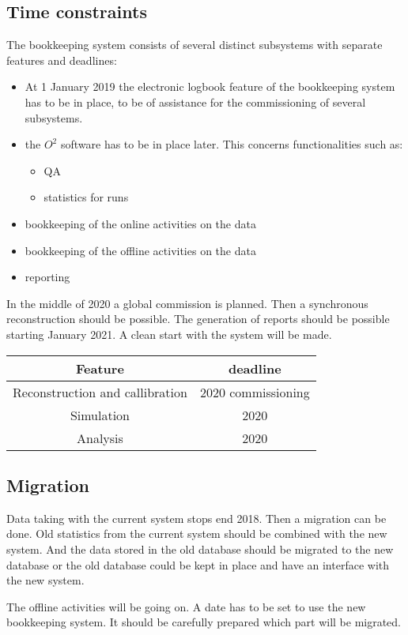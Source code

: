 \subsection{Time constraints}

The bookkeeping system consists of several distinct subsystems with separate features and deadlines:
\begin{itemize}
  \item At 1 January 2019 the electronic logbook feature of the bookkeeping system has to be in place, to be of assistance for the commissioning of several subsystems. 
  \item the $O^2$ software has to be in place later. This concerns functionalities such as:
  \begin{itemize}
    \item QA
    \item statistics for runs
  \end{itemize}
  \item bookkeeping of the online activities on the data
  \item bookkeeping of the offline activities on the data
  \item reporting
\end{itemize}
In the middle of 2020 a global commission is planned. Then a synchronous reconstruction should be possible. The generation of reports should be possible starting January 2021. A clean start with the system will be made.

\begin{tabular}{cc}
\hline
Feature & deadline\\
\hline
\hline
 Reconstruction and callibration  & 2020 commissioning \\
 \hline
Simulation   & 2020\\
\hline
Analysis & 2020\\
\hline
\end{tabular}

\subsection{Migration}
Data taking with the current system stops end 2018. Then a migration can be done. Old statistics from the current system should be combined with the new system. And the data stored in the old database should be migrated to the new database or the old database could be kept in place and have an interface with the new system. 

The offline activities will be going on. A date has to be set to use the new bookkeeping system. It should be carefully prepared which part will be migrated.

